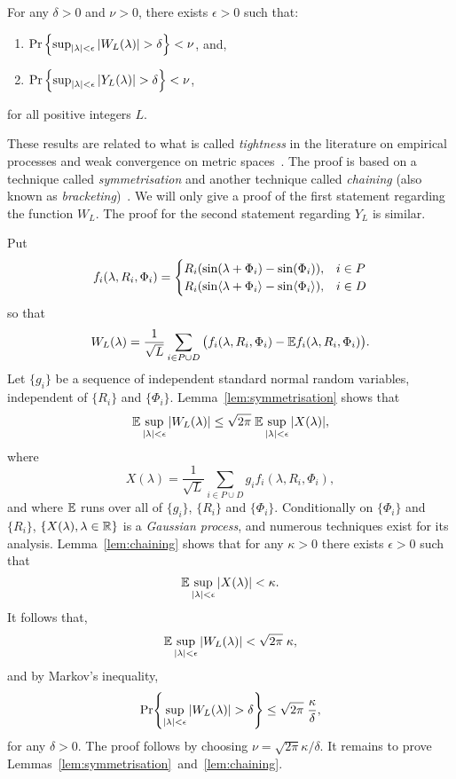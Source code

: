\documentclass[journal]{IEEEtran}
\begin{document}
\begin{lemma}\label{lem:ZYLempiricproc}
For any $\delta > 0$ and $\nu > 0$, there exists $\epsilon > 0$ such that:
\begin{enumerate}
\item $\Pr\left\{ \sup_{{\vert \lambda \vert}<\epsilon}{\vert W_L(\lambda) \vert} > \delta  \right\} < \nu$, and,
\item $\Pr\left\{ \sup_{{\vert \lambda \vert}<\epsilon}{\vert Y_L(\lambda) \vert} > \delta  \right\} < \nu$,
\end{enumerate}
for all positive integers $L$.
\end{lemma}
\begin{IEEEproof}
These results are related to what is called \emph{tightness} in the literature on empirical processes and weak convergence on metric spaces~\cite{Billingsley1999_convergence_of_probability_measures,Dudley_unif_central_lim_th_1999,Shorak_emp_proc_stat_2009}.  The proof is based on a technique called \emph{symmetrisation} and another technique called \emph{chaining} (also known as \emph{bracketing})~\cite{Pollard_asymp_empi_proc_1989,Gine_Zinn_symmetrisation_1984,Ossiander_clt_bracketing_1984}.  We will only give a proof of the first statement regarding the function $W_L$.  The proof for the second statement regarding $Y_L$ is similar.  

Put 
\[
f_i(\lambda, R_i, \Phi_i) = \begin{cases}
R_i( \sin(\lambda + \Phi_i) - \sin(\Phi_i)), & i \in P \\
R_i( \sin\langle \lambda + \Phi_i \rangle - \sin\langle \Phi_i \rangle), & i \in D \\
\end{cases}
\]
so that
\[
W_L(\lambda) = \frac{1}{\sqrt{L}} \sum_{i \in P \cup D} \big( f_i(\lambda, R_i, \Phi_i) - {\mathbb E} f_i(\lambda, R_i, \Phi_i) \big).
\]
Let $\{g_i\}$ be a sequence of independent standard normal random variables, independent of $\{R_i\}$ and $\{\Phi_i\}$.  Lemma~\ref{lem:symmetrisation} shows that
\[
{\mathbb E} \sup_{{\vert \lambda \vert} < \epsilon} {\left\vert  W_L(\lambda) \right\vert} \leq \sqrt{2\pi} \; {\mathbb E} \sup_{{\vert \lambda \vert} < \epsilon}  {\left\vert  X(\lambda)  \right\vert},
\]
where 
\begin{equation}\label{eq:ZpsiCondGaussProc}
X(\lambda) = \frac{1}{\sqrt{L}} \sum_{i \in P \cup D} g_i f_i(\lambda, R_i, \Phi_i),
\end{equation}
and where ${\mathbb E}$ runs over all of $\{g_i\}$, $\{R_i\}$ and $\{\Phi_i\}$.  Conditionally on $\{\Phi_i\}$ and $\{R_i\}$, $\{X(\lambda), \lambda \in {\mathbb R} \}$ is a \emph{Gaussian process}, and numerous techniques exist for its analysis.  Lemma~\ref{lem:chaining} shows that for any $\kappa > 0$ there exists $\epsilon > 0$ such that
\[
{\mathbb E} \sup_{{\vert \lambda \vert} < \epsilon} {\left\vert  X(\lambda)  \right\vert} < \kappa.
\]
It follows that,
\[
{\mathbb E} \sup_{{\vert \lambda \vert} < \epsilon} {\left\vert  W_L(\lambda) \right\vert}  <  \sqrt{2\pi} \; \kappa,
\]
and by Markov's inequality,
\[
{\operatorname{Pr}} {\left\{   \sup_{{\vert \lambda \vert} < \epsilon} {\left\vert  W_L(\lambda) \right\vert} > \delta  \right\}} \leq  \sqrt{2\pi} \; \frac{\kappa}{\delta},
\]
for any $\delta > 0$.  The proof follows by choosing $\nu =  \sqrt{2\pi} \kappa/\delta$.  It remains to prove Lemmas~\ref{lem:symmetrisation}~and~\ref{lem:chaining}.
\end{IEEEproof}
\end{document}
